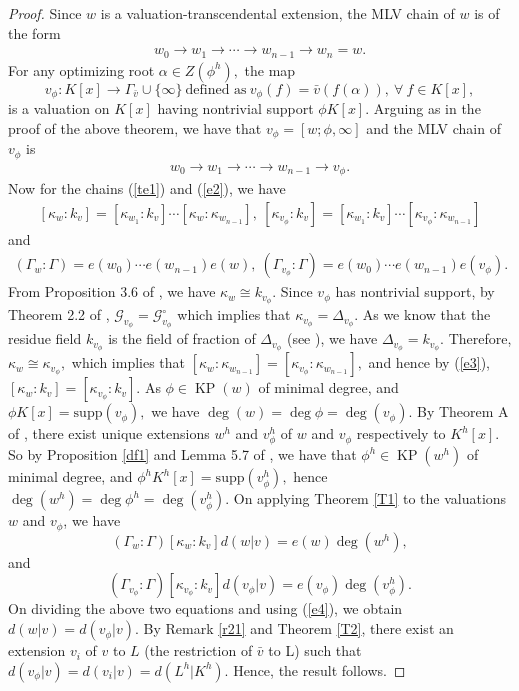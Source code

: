 \documentclass[11pt]{amsart}
\theoremstyle{definition}
\theoremstyle{remark}
\numberwithin{equation}{section}
\begin{document}
		\begin{proof}
			Since $w$ is a valuation-transcendental extension, the MLV chain of $w$ is of the form 
			\begin{align}\label{te1}
				w_0\longrightarrow w_1 \longrightarrow \cdots \longrightarrow w_{n-1} \longrightarrow w_n=w.
				\end{align} For any optimizing root $\alpha \in Z(\phi^h),$ the map\[v_{\phi} : K[x]\longrightarrow \Gamma_{\bar{v}}\cup \{\infty\}\  \text{defined as} \  v_{\phi}(f)=\bar{v}(f(\alpha)), \ \forall \ f\in K[x],\] is a valuation on $K[x]$ having nontrivial support $\phi K[x].$ Arguing as in the proof of the above theorem, we have that $v_{\phi} =[w; \phi,\infty]$ and the MLV chain of $v_{\phi}$ is
			\begin{align}\label{e2}
				w_0\longrightarrow w_1 \longrightarrow \cdots \longrightarrow w_{n-1} \longrightarrow v_{\phi}. \end{align} 
				Now for the chains (\ref{te1}) and (\ref{e2}), we have \begin{align}\label{e3}
				[\kappa_w:k_v]=[\kappa_{w_1}:k_v]\cdots [\kappa_w:\kappa_{w_{n-1}}],\ 
				[\kappa_{v_\phi}:k_v]=[\kappa_{w_1}:k_v]\cdots [\kappa_{v_\phi}:\kappa_{w_{n-1}}]
				\end{align}
				and
				\begin{align}\label{e4}
					(\Gamma_w:\Gamma)=e(w_0)\cdots e(w_{n-1})e(w),\ 
					 (\Gamma_{v_\phi}:\Gamma)=e(w_0)\cdots e(w_{n-1})e(v_\phi).
				\end{align} 
			 From Proposition 3.6 of \cite{EN4}, we have $\kappa_w \cong k_{v_\phi}.$ Since $v_\phi$ has nontrivial support, by Theorem 2.2 of \cite{EN3}, $\mathcal{G}_{v_\phi}=\mathcal{G}^\circ_{v_\phi}$ which implies that $\kappa_{v_\phi}=\Delta_{v_\phi}.$ As we know that the residue field $k_{v_\phi}$ is the field of fraction of $\Delta_{v_\phi}$ (see \cite[Section 4]{EN4}), we have $\Delta_{v_\phi}=k_{v_\phi}.$ Therefore, $\kappa_w \cong \kappa_{v_\phi},$ which implies that $[\kappa_w:\kappa_{w_{n-1}}]=[\kappa_{v_\phi}:\kappa_{w_{n-1}}],$ and hence by (\ref{e3}), $[\kappa_w:k_v]=[\kappa_{v_\phi}:k_v].$
			As $\phi \in \operatorname{KP}(w)$ of minimal degree, and $\phi K[x]=\text{supp}(v_\phi),$ we have $\deg(w)=\deg\phi=\deg (v_\phi).$ By Theorem A of \cite{EN5}, there exist unique extensions $w^h$ and $v_{\phi}^h$ of $w$ and $v_\phi$ respectively to $K^h[x].$ So by Proposition \ref{df1} and Lemma 5.7 of \cite{EN3}, we have that $\phi^h \in \operatorname{KP}(w^h)$ of minimal degree, and $\phi^h K^h[x]=\text{supp}(v_{\phi}^h),$ hence $\deg (w^h)=\deg\phi^h=\deg (v_{\phi}^h).$ On applying Theorem \ref{T1} to the valuations $w$ and $v_\phi$, we have
			\[(\Gamma_w:\Gamma)[\kappa_w:k_v]d(w|v)=e(w)\deg(w^h),\]and
			\[(\Gamma_{v_\phi}:\Gamma)[\kappa_{v_\phi}:k_v]d(v_\phi|v)=e(v_\phi)\deg(v_{\phi}^h).\] On dividing the above two equations and using (\ref{e4}), we obtain $d(w|v)=d(v_\phi|v).$ By Remark \ref{r21} and Theorem \ref{T2}, there exist an extension $v_i$ of $v$ to $L$ (the restriction of $\bar{v}$ to L) such that $d(v_\phi|v)=d(v_i|v)=d(L^h|K^h).$ Hence, the result follows.
	    \end{proof}
\end{document}
